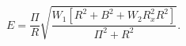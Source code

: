 \begin{equation}
\label{elect1}
E = \frac{\Pi}{R}
\sqrt{\frac{W_1 [R^2 + B^2 + W_2 R_x^2 R^2]}{\Pi^2 + R^2}}.
\end{equation}

